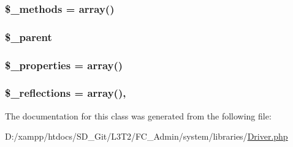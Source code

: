 \subsubsection[{\$\+\_\+methods}]{\setlength{\rightskip}{0pt plus 5cm}\$\+\_\+methods = array()\hspace{0.3cm}{\ttfamily [protected]}}\label{class_c_i___driver_a148e2042f169cec802078e58a46ace92}
\hypertarget{class_c_i___driver_a8c040f02d9e695416231845d2aaf7f59}{}
\subsubsection[{\$\+\_\+parent}]{\setlength{\rightskip}{0pt plus 5cm}\$\+\_\+parent\hspace{0.3cm}{\ttfamily [protected]}}\label{class_c_i___driver_a8c040f02d9e695416231845d2aaf7f59}
\hypertarget{class_c_i___driver_a677f712430f384ffa402fac50940ace4}{}
\subsubsection[{\$\+\_\+properties}]{\setlength{\rightskip}{0pt plus 5cm}\$\+\_\+properties = array()\hspace{0.3cm}{\ttfamily [protected]}}\label{class_c_i___driver_a677f712430f384ffa402fac50940ace4}
\hypertarget{class_c_i___driver_a3eae4dfd334261dd94fe0e148501513f}{}
\subsubsection[{\$\+\_\+reflections}]{\setlength{\rightskip}{0pt plus 5cm}\$\+\_\+reflections = array()\hspace{0.3cm}{\ttfamily [static]}, {\ttfamily [protected]}}\label{class_c_i___driver_a3eae4dfd334261dd94fe0e148501513f}


The documentation for this class was generated from the following file\+:\begin{DoxyCompactItemize}
\item 
D\+:/xampp/htdocs/\+S\+D\+\_\+\+Git/\+L3\+T2/\+F\+C\+\_\+\+Admin/system/libraries/\hyperlink{system_2libraries_2_driver_8php}{Driver.\+php}\end{DoxyCompactItemize}
